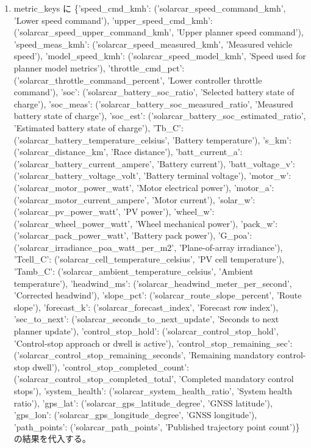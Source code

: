 \documentclass[a4paper,11pt]{article}
\begin{document}
            \begin{enumerate}[leftmargin=1.8em]
            \item metric\_keys に \{'speed\_cmd\_kmh': ('solarcar\_speed\_command\_kmh', 'Lower speed command'), 'upper\_speed\_cmd\_kmh': ('solarcar\_speed\_upper\_command\_kmh', 'Upper planner speed command'), 'speed\_meas\_kmh': ('solarcar\_speed\_measured\_kmh', 'Measured vehicle speed'), 'model\_speed\_kmh': ('solarcar\_speed\_model\_kmh', 'Speed used for planner model metrics'), 'throttle\_cmd\_pct': ('solarcar\_throttle\_command\_percent', 'Lower controller throttle command'), 'soc': ('solarcar\_battery\_soc\_ratio', 'Selected battery state of charge'), 'soc\_meas': ('solarcar\_battery\_soc\_measured\_ratio', 'Measured battery state of charge'), 'soc\_est': ('solarcar\_battery\_soc\_estimated\_ratio', 'Estimated battery state of charge'), 'Tb\_C': ('solarcar\_battery\_temperature\_celsius', 'Battery temperature'), 's\_km': ('solarcar\_distance\_km', 'Race distance'), 'batt\_current\_a': ('solarcar\_battery\_current\_ampere', 'Battery current'), 'batt\_voltage\_v': ('solarcar\_battery\_voltage\_volt', 'Battery terminal voltage'), 'motor\_w': ('solarcar\_motor\_power\_watt', 'Motor electrical power'), 'motor\_a': ('solarcar\_motor\_current\_ampere', 'Motor current'), 'solar\_w': ('solarcar\_pv\_power\_watt', 'PV power'), 'wheel\_w': ('solarcar\_wheel\_power\_watt', 'Wheel mechanical power'), 'pack\_w': ('solarcar\_pack\_power\_watt', 'Battery pack power'), 'G\_poa': ('solarcar\_irradiance\_poa\_watt\_per\_m2', 'Plane-of-array irradiance'), 'Tcell\_C': ('solarcar\_cell\_temperature\_celsius', 'PV cell temperature'), 'Tamb\_C': ('solarcar\_ambient\_temperature\_celsius', 'Ambient temperature'), 'headwind\_ms': ('solarcar\_headwind\_meter\_per\_second', 'Corrected headwind'), 'slope\_pct': ('solarcar\_route\_slope\_percent', 'Route slope'), 'forecast\_k': ('solarcar\_forecast\_index', 'Forecast row index'), 'sec\_to\_next': ('solarcar\_seconds\_to\_next\_update', 'Seconds to next planner update'), 'control\_stop\_hold': ('solarcar\_control\_stop\_hold', 'Control-stop approach or dwell is active'), 'control\_stop\_remaining\_sec': ('solarcar\_control\_stop\_remaining\_seconds', 'Remaining mandatory control-stop dwell'), 'control\_stop\_completed\_count': ('solarcar\_control\_stop\_completed\_total', 'Completed mandatory control stops'), 'system\_health': ('solarcar\_system\_health\_ratio', 'System health ratio'), 'gps\_lat': ('solarcar\_gps\_latitude\_degree', 'GNSS latitude'), 'gps\_lon': ('solarcar\_gps\_longitude\_degree', 'GNSS longitude'), 'path\_points': ('solarcar\_path\_points', 'Published trajectory point count')\} の結果を代入する。

\end{enumerate}
\end{document}
